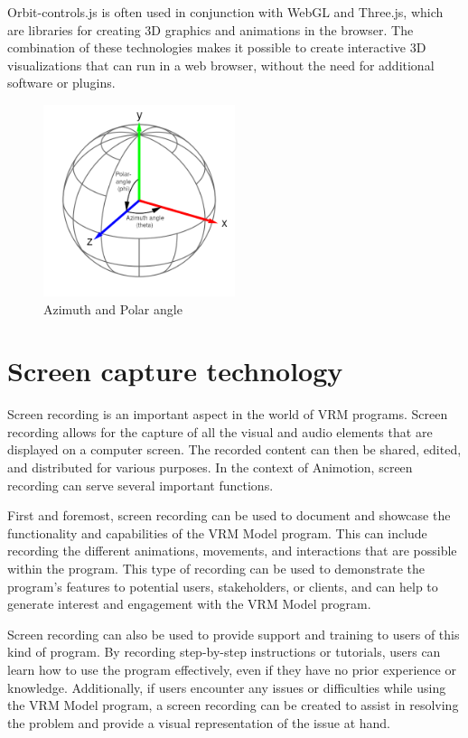 Orbit-controls.js is often used in conjunction with WebGL and Three.js, which are libraries for creating 
3D graphics and animations in the browser. The combination of these technologies makes it possible to create 
interactive 3D visualizations that can run in a web browser, without the need for additional software or plugins.
\\
\begin{figure}[htb]
  \centering
  \includegraphics[width=0.5\textwidth]{pics/orbitcontrols.png}
  \caption{Azimuth and Polar angle}
  \label{fig:orbitcontrols}
\end{figure}
\newpage
\section{Screen capture technology}
Screen recording is an important aspect in the world of VRM programs. 
Screen recording allows for the capture of all the visual and audio elements that are displayed 
on a computer screen. The recorded content can then be shared, edited, and distributed for various 
purposes. In the context of Animotion, screen recording can serve several important functions.

First and foremost, screen recording can be used to document and showcase the functionality and 
capabilities of the VRM Model program. This can include recording the different animations, movements, 
and interactions that are possible within the program. This type of recording can be used to demonstrate 
the program's features to potential users, stakeholders, or clients, and can help to generate interest 
and engagement with the VRM Model program.

Screen recording can also be used to provide support and training to users of this kind of program. 
By recording step-by-step instructions or tutorials, users can learn how to use the program effectively, 
even if they have no prior experience or knowledge. Additionally, if users encounter any issues or 
difficulties while using the VRM Model program, a screen recording can be created to assist in resolving 
the problem and provide a visual representation of the issue at hand.

